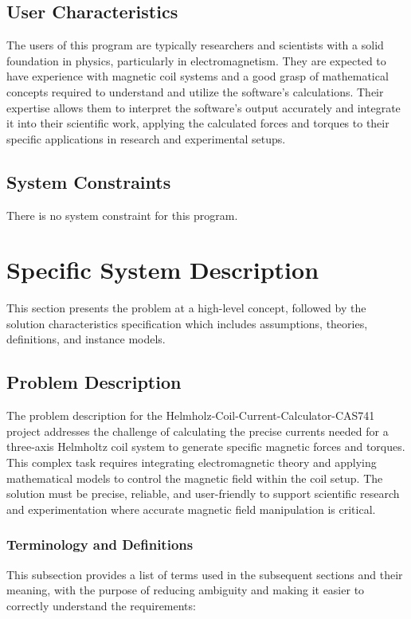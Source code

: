 \documentclass[12pt]{article}
\begin{document}
\subsection{User Characteristics} \label{SecUserCharacteristics}

The users of this program are typically researchers and scientists with a solid foundation in physics, particularly in electromagnetism. They are expected to have experience with magnetic coil systems and a good grasp of mathematical concepts required to understand and utilize the software's calculations. Their expertise allows them to interpret the software's output accurately and integrate it into their scientific work, applying the calculated forces and torques to their specific applications in research and experimental setups.

\subsection{System Constraints}

There is no system constraint for this program.

\section{Specific System Description}

This section presents the problem at a high-level concept, followed by the solution characteristics specification which includes assumptions, theories, definitions, and instance models.

\subsection{Problem Description} \label{Sec_pd}

The problem description for the Helmholz-Coil-Current-Calculator-CAS741 project addresses the challenge of calculating the precise currents needed for a three-axis Helmholtz coil system to generate specific magnetic forces and torques. This complex task requires integrating electromagnetic theory and applying mathematical models to control the magnetic field within the coil setup. The solution must be precise, reliable, and user-friendly to support scientific research and experimentation where accurate magnetic field manipulation is critical.
\subsubsection{Terminology and  Definitions}
This subsection provides a list of terms used in the subsequent
sections and their meaning, with the purpose of reducing ambiguity and making it easier to correctly understand the requirements:
\end{document}
